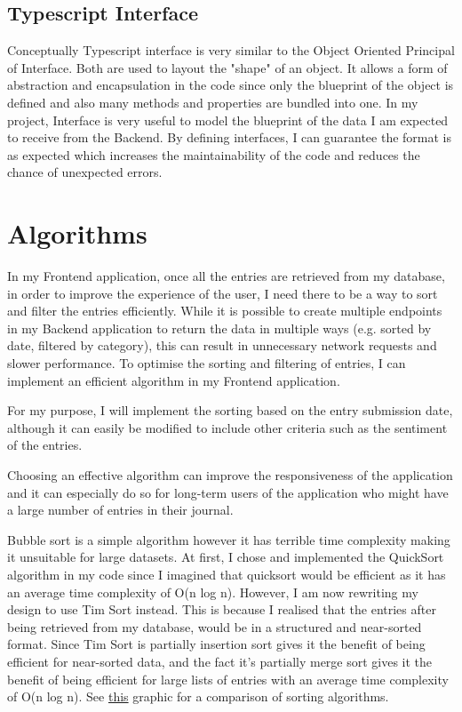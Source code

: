 \subsection{Typescript Interface}
Conceptually Typescript interface is very similar to the Object Oriented Principal of Interface. Both are used to layout the "shape" of an object. It allows a form of abstraction and encapsulation in the code since only the blueprint of the object is defined and also many methods and properties are bundled into one. In my project, Interface is very useful to model the blueprint of the data I am expected to receive from the Backend. By defining interfaces, I can guarantee the format is as expected which increases the maintainability of the code and reduces the chance of unexpected errors.


\section{Algorithms}
In my Frontend application, once all the entries are retrieved from my database, in order to improve the experience of the user, I need there to be a way to sort and filter the entries efficiently. While it is possible to create multiple endpoints in my Backend application to return the data in multiple ways (e.g. sorted by date, filtered by category), this can result in unnecessary network requests and slower performance. To optimise the sorting and filtering of entries, I can implement an efficient algorithm in my Frontend application.

For my purpose, I will implement the sorting based on the entry submission date, although it can easily be modified to include other criteria such as the sentiment of the entries.

Choosing an effective algorithm can improve the responsiveness of the application and it can especially do so for long-term users of the application who might have a large number of entries in their journal.

Bubble sort is a simple algorithm however it has terrible time complexity making it unsuitable for large datasets. At first, I chose and implemented the QuickSort algorithm in my code since I imagined that quicksort would be efficient as it has an average time complexity of O(n log n). However, I am now rewriting my design to use Tim Sort\cite{geekific2022timsort} instead. This is because I realised that the entries after being retrieved from my database, would be in a structured and near-sorted format. Since Tim Sort is partially insertion sort gives it the benefit of being efficient for near-sorted data, and the fact it's partially merge sort gives it the benefit of being efficient for large lists of entries with an average time complexity of O(n log n). See \href{https://www.toptal.com/developers/sorting-algorithms}{this} graphic for a comparison of sorting algorithms.

